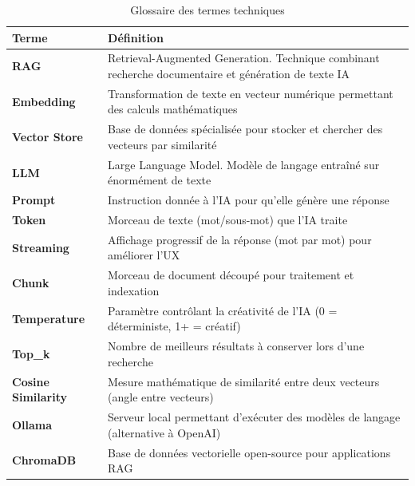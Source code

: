 \documentclass[12pt,a4paper]{report}
\begin{document}
\begin{table}[H]
    \centering
    \renewcommand{\arraystretch}{1.4}
    \begin{tabularx}{\textwidth}{|l|X|}
        \hline
        \rowcolor{green!20}
        \textbf{Terme} & \textbf{Définition} \\
        \hline
        \textbf{RAG} & Retrieval-Augmented Generation. Technique combinant recherche documentaire et génération de texte IA \\
        \hline
        \textbf{Embedding} & Transformation de texte en vecteur numérique permettant des calculs mathématiques \\
        \hline
        \textbf{Vector Store} & Base de données spécialisée pour stocker et chercher des vecteurs par similarité \\
        \hline
        \textbf{LLM} & Large Language Model. Modèle de langage entraîné sur énormément de texte \\
        \hline
        \textbf{Prompt} & Instruction donnée à l'IA pour qu'elle génère une réponse \\
        \hline
        \textbf{Token} & Morceau de texte (mot/sous-mot) que l'IA traite \\
        \hline
        \textbf{Streaming} & Affichage progressif de la réponse (mot par mot) pour améliorer l'UX \\
        \hline
        \textbf{Chunk} & Morceau de document découpé pour traitement et indexation \\
        \hline
        \textbf{Temperature} & Paramètre contrôlant la créativité de l'IA (0 = déterministe, 1+ = créatif) \\
        \hline
        \textbf{Top\_k} & Nombre de meilleurs résultats à conserver lors d'une recherche \\
        \hline
        \textbf{Cosine Similarity} & Mesure mathématique de similarité entre deux vecteurs (angle entre vecteurs) \\
        \hline
        \textbf{Ollama} & Serveur local permettant d'exécuter des modèles de langage (alternative à OpenAI) \\
        \hline
        \textbf{ChromaDB} & Base de données vectorielle open-source pour applications RAG \\
        \hline
    \end{tabularx}
    \caption{Glossaire des termes techniques}
\end{table}

\end{document}
